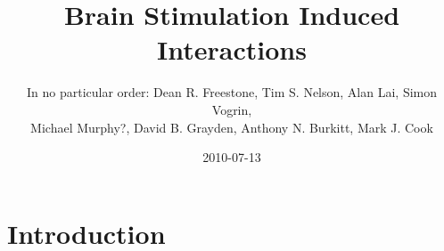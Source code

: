\documentclass[]{article}
\title{Brain Stimulation Induced Interactions}
\author{In no particular order: Dean R. Freestone, Tim S. Nelson, Alan Lai, Simon Vogrin,\\
 Michael Murphy?, David B. Grayden, Anthony N. Burkitt, Mark J. Cook}
\date{2010-07-13}
\begin{document}
\ifpdf
{}
\else
{}
\fi

\maketitle


\begin{abstract}
\end{abstract}

\section{Introduction}
% 
% 
\end{document}
